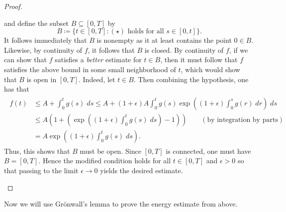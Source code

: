 \documentclass{article}
\begin{document}
\begin{proof}
\begin{enumerate}[itemsep =-2pt,label = (\arabic{*})]
		and define the subset $B \subseteq [0,T]$ by 
		\begin{equation*}
			B \coloneqq \{t \in [0,T]: (\star) \text{ holds for all $s \in [0,t]$}\}. 
		\end{equation*}
		It follows immediately that $B$ is nonempty as it at least contains the point $0 \in B$. Likewise, by continuity of $f$, it follows that $B$ is closed. By continuity of $f$, if we can show that $f$ satisfies a \textit{better} estimate for $t \in B$, then it must follow that $f$ satisfies the above bound in some small neighborhood of $t$, which would show that $B$ is open in $[0,T]$. Indeed, let $t \in B$. Then combining the hypothesis, one has that 
		\begin{align*}
			\begin{split}
				f(t) &\leq A + \int_{0}^{t}g(s)\;ds \leq A + (1 + \epsilon)A\int_{0}^{t}g(s)\exp\left((1 + \epsilon)\int_{0}^{s}g(r)\;dr\right)\;ds \\
				&\leq A\left(1 + \left(\exp\left((1 + \epsilon)\int_{0}^{t}g(s)\;ds\right)-1\right)\right) \qquad (\text{by integration by parts}) \\
				&= A\exp\left((1 + \epsilon)\int_{0}^{t}g(s)\;ds\right). 
			\end{split}
		\end{align*}
		Thus, this shows that $B$ must be open. Since $[0,T]$ is connected, one must have $B = [0,T]$. Hence the modified condition holds for all $t \in [0,T]$ and $\epsilon > 0$ so that passing to the limit $\epsilon \to 0$ yields the desired estimate. 
	\end{enumerate}
\end{proof}

Now we will use Gr\"onwall's lemma to prove the energy estimate from above. 
\end{document}
